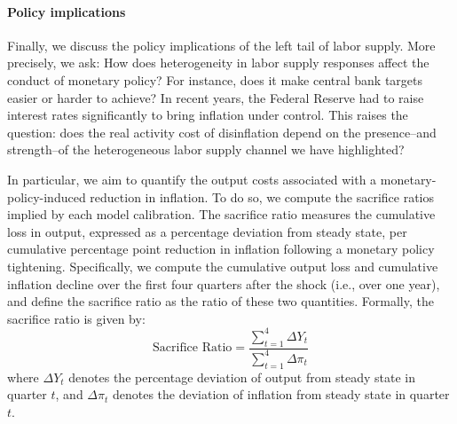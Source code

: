 \documentclass[a4paper,12pt]{article}%
\begin{document}



\paragraph{Policy implications} Finally, we discuss the policy implications of the left tail of labor supply. More precisely, we ask: How does heterogeneity in labor supply responses affect the conduct of monetary policy? For instance, does it make central bank targets easier or harder to achieve? In recent years, the Federal Reserve had to raise interest rates significantly to bring inflation under control. This raises the question: does the real activity cost of disinflation depend on the presence--and strength--of the heterogeneous labor supply channel we have highlighted?

In particular, we aim to quantify the output costs associated with a monetary-policy-induced reduction in inflation. To do so, we compute the sacrifice ratios implied by each model calibration. The sacrifice ratio measures the cumulative loss in output, expressed as a percentage deviation from steady state, per cumulative percentage point reduction in inflation following a monetary policy tightening.
Specifically, we compute the cumulative output loss and cumulative inflation decline over the first four quarters after the shock (i.e., over one year), and define the sacrifice ratio as the ratio of these two quantities. Formally, the sacrifice ratio is given by:
\[
\text{Sacrifice Ratio} = \frac{\sum_{t=1}^{4} \Delta Y_t}{\sum_{t=1}^{4} \Delta \pi_t}
\]
where $\Delta Y_t$ denotes the percentage deviation of output from steady state in quarter $t$, and $\Delta \pi_t$ denotes the deviation of inflation from steady state in quarter $t$.
\end{document}
